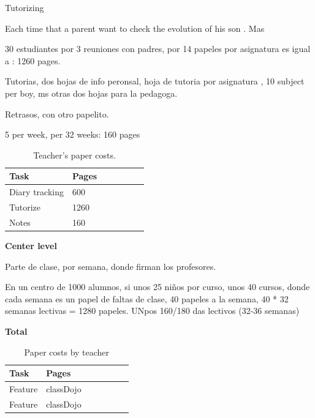 \documentclass[oneside,english,titlepage]{scrbook}
\begin{document}
 


Tutorizing 

Each time that a parent want to check the evolution of his son  . Mas 

30 estudiantes por 3 reuniones con padres, por 14 papeles por 
asignatura es igual a : 1260 pages. 



Tutorias, dos hojas de info peronsal, hoja de tutoria por asignatura , 10 subject per boy, ms otras dos hojas para la pedagoga. 



Retrasos, con otro papelito.

5 per week, per 32 weeks: 160 pages

\begin{table}[]
\centering

\begin{tabular}{@{}lllllll@{}}

Task & Pages\\ 
\midrule

Diary tracking & 600 \\
Tutorize & 1260 \\ 
Notes & 160 \\

\end{tabular}
\caption{Teacher's paper costs.}
\label{my-label}
\end{table}


\textbf{Center level}

Parte de clase, por semana, donde firman los profesores.

En un centro de 1000 alumnos, si unos 25 niños por curso, unos 40 cursos,
donde cada semana es un papel de faltas de clase, 40 papeles a la semana,
40 * 32 semanas lectivas = 1280 papeles.
UNpos 160/180 das lectivos (32-36 semanas)

\textbf{Total}



\begin{table}[]
\centering

\begin{tabular}{@{}lllllll@{}}

Task & Pages\\ 
\midrule

Feature & classDojo\\
Feature & classDojo\\

\end{tabular}
\caption{Paper costs by teacher}
\label{my-label}
\end{table}
\end{document}
